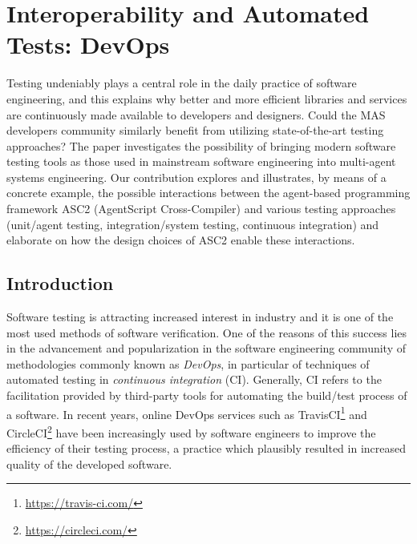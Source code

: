 \chapter{Interoperability and Automated Tests: DevOps}

Testing undeniably plays a central role in the daily practice of software engineering, and this explains why better and more efficient libraries and services are continuously made available to developers and designers. Could the MAS developers community similarly benefit from utilizing state-of-the-art testing approaches? The paper investigates the possibility of bringing  modern software testing tools as those used in mainstream software engineering into multi-agent systems engineering. Our contribution explores and illustrates, by means of a concrete example, the possible interactions between the agent-based programming framework ASC2 (AgentScript Cross-Compiler)  and various testing approaches (unit/agent testing, integration/system testing, continuous integration) and elaborate on how the design choices of ASC2 enable these interactions.


\section{Introduction}

Software testing is attracting increased interest in industry \cite{market_reports_2019} and it is one of the most used methods of software verification. One of the reasons of this success lies in the advancement and popularization in the software engineering community of methodologies commonly known as \textit{DevOps}, in particular of techniques of automated testing in \textit{continuous integration} (CI). Generally, CI refers to the facilitation provided by third-party tools for automating the build/test process of a software. In recent years, online DevOps services such as TravisCI\footnote{\url{https://travis-ci.com/}} and CircleCI\footnote{\url{https://circleci.com/}} have been increasingly used by software engineers to improve the efficiency of their testing process, a practice which plausibly resulted in increased quality of the developed software.

